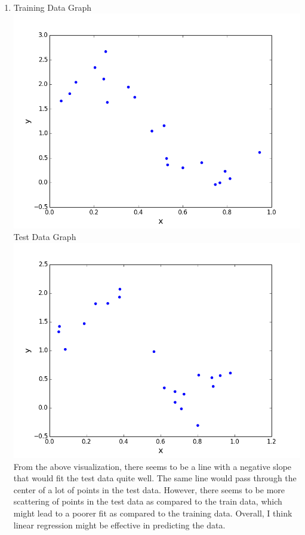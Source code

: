 \documentclass[11pt]{article}
\newcommand{\solution}[1]{{{\color{blue}{\bf Solution:} {#1}}}}
\begin{document}
\begin{enumerate}
\item
\solution{} \newline
Training Data Graph \newline
\includegraphics[scale=0.4]{train.png} \newline
Test Data Graph \newline
\includegraphics[scale=0.4]{test.png} \newline
From the above visualization, there seems to be a line with a negative slope that would fit the 
test data quite well. The same line would pass through the center of a lot of points in the test
data. However, there seems to be more scattering of points in the test data as compared to the 
train data, which might lead to a poorer fit as compared to the training data. \newline
Overall, I think linear regression might be effective in predicting the data.


\end{enumerate}
\end{document}
